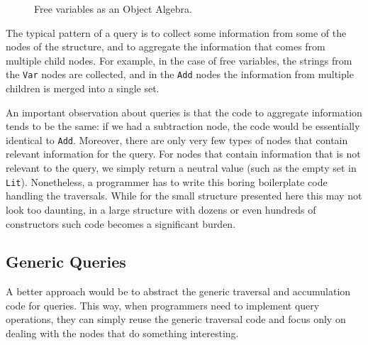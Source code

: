 \begin{figure}[t]
\nocaptionrule
\caption{Free variables as an Object Algebra.}
\label{freevars_without_monoid}
\end{figure}
\begin{comment}
\bruno{put code in a figure, add a caption and refer
  to the figure in the text.}
\end{comment}

The typical pattern of a query is to collect some information from
some of the nodes of the structure, and to aggregate the information
that comes from multiple child nodes. For example, in the case of free
variables, the strings from the \lstinline{Var} nodes are collected,
and in the \lstinline{Add} nodes the information from multiple
children is merged into a single set.

An important observation about
queries is that the code to aggregate information tends to be the
same: if we had a subtraction node, the code would be essentially
identical to \lstinline{Add}. Moreover, there are only very few types
of nodes that contain relevant information for the query. For nodes
that contain information that is not relevant to the query, we simply
return a neutral value (such as the empty set in \lstinline{Lit}).
Nonetheless, a programmer has to write this boring boilerplate code
handling the traversals.  While for the small structure presented here
this may not look too daunting, in a large structure with dozens or
even hundreds of constructors such code becomes a significant burden.


\subsection{Generic Queries}\label{subsec:genericquery}

A better approach would be to abstract the generic traversal
and accumulation code for queries. This way, when programmers need to implement query
operations, they can simply reuse the generic traversal code and
focus only on dealing with the nodes that do something interesting.


